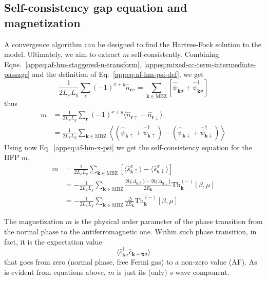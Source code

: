 \subsection{Self-consistency gap equation and magnetization}\label{appsubsec:af-self-consistency-gap-equation}

A convergence algorithm can be designed to find the Hartree-Fock solution to the model. Ultimately, we aim to extract $m$ self-consistently. Combining Eqns.~\eqref{appeq:af-hm-staggered-n-transform}, \eqref{appeq:mixed-cc-term-intermediate-passage} and the definition of Eq.~\eqref{appeq:af-hm-psi-def}, we get
\[
	\frac{1}{2L_xL_y} \sum_\mathbf{r} (-1)^{x+y} \hat n_{\mathbf{r}\sigma} = \sum_{\mathbf{k}\in\mathrm{MBZ}} \left[
		\hat \psi_{\mathbf{k}\sigma} + \hat \psi_{\mathbf{k}\sigma}^\dagger
	\right]
\]
thus
\[
\begin{aligned}
	m &= \frac{1}{2L_xL_y} \sum_\mathbf{r} (-1)^{x+y} \langle
		\hat n_{\mathbf{r}\uparrow} - \hat n_{\mathbf{r}\downarrow}
	\rangle \\
	&= \frac{1}{2L_xL_y} \sum_{\mathbf{k} \in \mathrm{MBZ}} \left\langle
		\left(\hat \psi_{\mathbf{k}\uparrow} + \hat \psi_{\mathbf{k}\uparrow}^\dagger\right) - \left(\hat \psi_{\mathbf{k}\downarrow} + \hat \psi_{\mathbf{k}\downarrow}^\dagger\right)
	\right\rangle
\end{aligned}
\]
Using now Eq.~\eqref{appeq:af-hm-x-psi} we get the self-consistency equation for the HFP $m$,
\begin{align}
	m &= \frac{1}{2L_xL_y} \sum_{\mathbf{k} \in \mathrm{MBZ}} \left[
		\langle
			\hat s_{\mathbf{k}\uparrow}^x
		\rangle
		 - 
		 \langle
			 \hat s_{\mathbf{k}\downarrow}^x
		 \rangle
	\right] \nonumber \\
	&= -\frac{1}{2L_xL_y} \sum_{\mathbf{k} \in \mathrm{MBZ}} \frac{\Re\lbrace\Delta_{\mathbf{k}\uparrow}\rbrace-\Re\lbrace\Delta_{\mathbf{k}\downarrow}\rbrace}{2E_\mathbf{k}} \mathrm{Th}_\mathbf{k}^{(-)}[\beta,\mu] \nonumber \\
	&= -\frac{1}{2L_x L_y} \sum_{\mathbf{k} \in \mathrm{MBZ}} \frac{\Delta}{2E_\mathbf{k}} \mathrm{Th}_\mathbf{k}^{(-)}[\beta,\mu] \label{appeq:hm-af-m-self-consistency}
\end{align}

The magnetization $m$ is the physical order parameter of the phase transition from the normal phase to the antiferromagnetic one. Within such phase transition, in fact, it is the expectation value
\[
	\langle
		\hat c_{\mathbf{k}\sigma}^\dagger \hat 	c_{\mathbf{k}+\bm{\pi}\sigma} 
	\rangle
\]
that goes from zero (normal phase, free Fermi gas) to a non-zero value (AF). As is evident from equations above, $m$ is just its (only) $s$-wave component.

